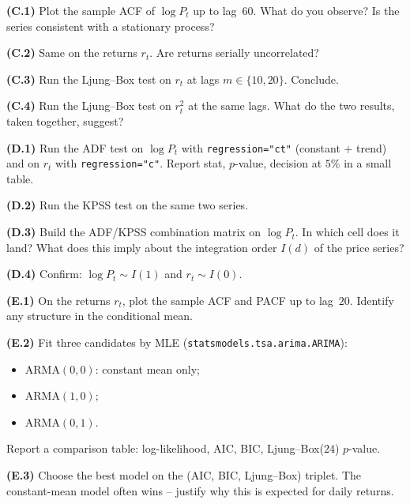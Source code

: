\documentclass[a4paper,11pt]{article}
\begin{document}
\begin{exercise}
\textbf{(C.1)} Plot the sample ACF of $\log P_t$ up to lag~$60$.
What do you observe? Is the series consistent with a stationary
process?

\textbf{(C.2)} Same on the returns $r_t$. Are returns serially
uncorrelated?

\textbf{(C.3)} Run the Ljung--Box test on $r_t$ at lags $m \in
\{10, 20\}$. Conclude.

\textbf{(C.4)} Run the Ljung--Box test on $r_t^2$ at the same
lags. What do the two results, taken together, suggest?
\end{exercise}

\begin{exercise}
\textbf{(D.1)} Run the ADF test on $\log P_t$ with
\texttt{regression="ct"} (constant + trend) and on $r_t$ with
\texttt{regression="c"}. Report stat, $p$-value, decision at
$5\%$ in a small table.

\textbf{(D.2)} Run the KPSS test on the same two series.

\textbf{(D.3)} Build the ADF/KPSS combination matrix on
$\log P_t$. In which cell does it land? What does this imply
about the integration order $I(d)$ of the price series?

\textbf{(D.4)} Confirm: $\log P_t \sim I(1)$ and $r_t \sim I(0)$.
\end{exercise}

\begin{exercise}
\textbf{(E.1)} On the returns $r_t$, plot the sample ACF and PACF
up to lag~$20$. Identify any structure in the conditional mean.

\textbf{(E.2)} Fit three candidates by MLE
(\texttt{statsmodels.tsa.arima.ARIMA}):
\begin{itemize}
  \item ARMA$(0, 0)$: constant mean only;
  \item ARMA$(1, 0)$;
  \item ARMA$(0, 1)$.
\end{itemize}
Report a comparison table: log-likelihood, AIC, BIC,
Ljung--Box($24$) $p$-value.

\textbf{(E.3)} Choose the best model on the (AIC, BIC, Ljung--Box)
triplet. The constant-mean model often wins -- justify why this is
expected for daily returns.
\end{exercise}
\end{document}
